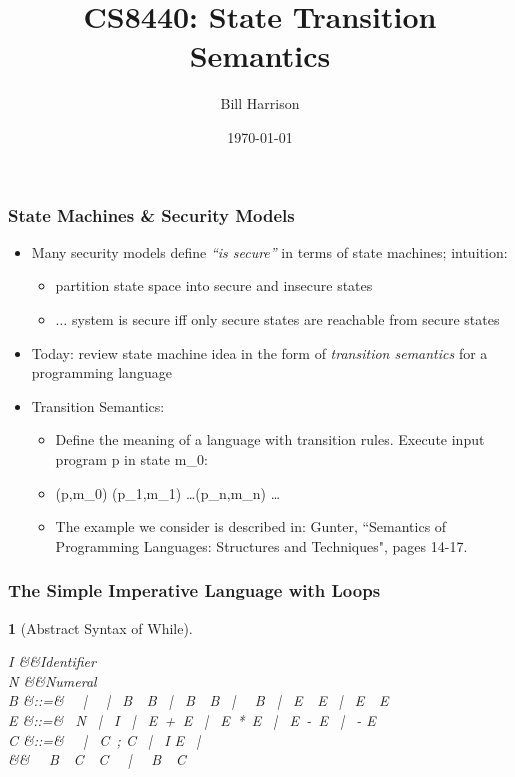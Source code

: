 \documentclass{beamer}
\title{CS8440: State Transition Semantics}
\author{Bill Harrison}
\date{\today}
\newtheorem{remark}{}
\begin{document}
\frame{\titlepage}

\frame
{
    \frametitle{State Machines \& Security Models}
    
\begin{itemize}
\item Many security models define \emph{``is secure''} in terms of state machines; intuition:
\begin{itemize}
\item partition state space into secure and insecure states
\item $\ldots$ system is secure iff only secure states are reachable from secure states
\end{itemize}

\pause
\item Today: review state machine idea in the form of \emph{transition semantics} for a programming language

\pause
\item Transition Semantics: 
\begin{itemize}
\item Define the meaning of a language with transition rules. Execute input program \<p\> in state \<m_0\>:
\item  \<(p,m_0) \ra (p_1,m_1) \ra \ldots \ra (p_n,m_n) \ra \ldots\>
\item The example we consider is described in: Gunter, ``Semantics of Programming Languages: Structures and Techniques", pages 14-17.
\end{itemize}
\end{itemize}

}

\frame
{
    \frametitle{The Simple Imperative Language with Loops}

\begin{remark}[Abstract Syntax of While]
\begin{haskell}
I &\in&\relax Identifier
\\
N &\in&\relax Numeral
\\
B &::=&\relax~  ~|~  ~|~ B\, \, B ~|~ B\, \, B ~|~ \, B ~|~ E\, \hskwd{<}\, E ~|~ E \,\hskwd{=}\, E
\\
E &::=&\relax~ N ~|~ I ~|~ E \,+\, E ~|~ E \,*\, E ~|~ E\, -\, E ~|~ - E
\\
C &::=&\relax~  ~|~ C\, ; C ~|~ I \hskwd{:=} E ~|~ 
\\
&&\relax~ \, B \,\, C\, \, C \, ~|~ \, B\, \, C\, 
\end{haskell}
\end{remark}


}
\end{document}
